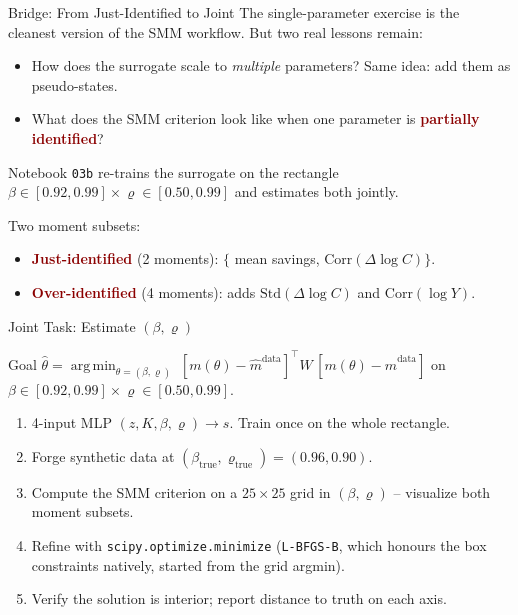 \documentclass[10pt,aspectratio=169]{beamer}
\newcommand{\emphc}[1]{\textbf{\textcolor{darkred}{#1}}}
\DeclareMathOperator*{\argmin}{arg\,min}
\begin{document}
\begin{frame}{Bridge: From Just-Identified to Joint}
\small
The single-parameter exercise is the cleanest version of the SMM workflow. But two real lessons remain:
\begin{itemize}
\itemsep1pt
  \item How does the surrogate scale to \emph{multiple} parameters? Same idea: add them as pseudo-states.
  \item What does the SMM criterion look like when one parameter is \emphc{partially identified}?
\end{itemize}
\vspace{0.1cm}
Notebook \texttt{03b} re-trains the surrogate on the rectangle $\beta \in [0.92, 0.99] \times \varrho \in [0.50, 0.99]$ and estimates both jointly.

\vspace{0.2cm}
Two moment subsets:
\begin{itemize}
  \item \emphc{Just-identified} (2 moments): $\{$ mean savings, $\mathrm{Corr}(\Delta\log C)\}$.
  \item \emphc{Over-identified} (4 moments): adds $\mathrm{Std}(\Delta\log C)$ and $\mathrm{Corr}(\log Y)$.
\end{itemize}
\end{frame}

\begin{frame}{Joint Task: Estimate $(\beta, \varrho)$}
\begin{block}{Goal}
$\hat\theta = \argmin_{\theta = (\beta,\varrho)}\; [m(\theta) - \hat{m}^{\mathrm{data}}]^\top W\, [m(\theta) - \hat{m}^{\mathrm{data}}]$ \quad on $\beta\in[0.92,0.99] \times \varrho\in[0.50, 0.99]$.
\end{block}
\begin{enumerate}
  \itemsep1pt
  \item 4-input MLP $(z, K, \beta, \varrho) \to s$. Train once on the whole rectangle.
  \item Forge synthetic data at $(\beta_{\text{true}}, \varrho_{\text{true}}) = (0.96, 0.90)$.
  \item Compute the SMM criterion on a $25\times 25$ grid in $(\beta, \varrho)$ -- visualize both moment subsets.
  \item Refine with \texttt{scipy.optimize.minimize} (\texttt{L-BFGS-B}, which honours the box constraints natively, started from the grid argmin).
  \item Verify the solution is interior; report distance to truth on each axis.
\end{enumerate}
\end{frame}
\end{document}
